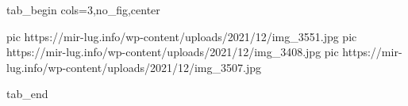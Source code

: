  
 
 
 
 


\ifcmt
  tab_begin cols=3,no_fig,center

     pic https://mir-lug.info/wp-content/uploads/2021/12/img_3551.jpg
		 pic https://mir-lug.info/wp-content/uploads/2021/12/img_3408.jpg
		 pic https://mir-lug.info/wp-content/uploads/2021/12/img_3507.jpg

  tab_end
\fi
